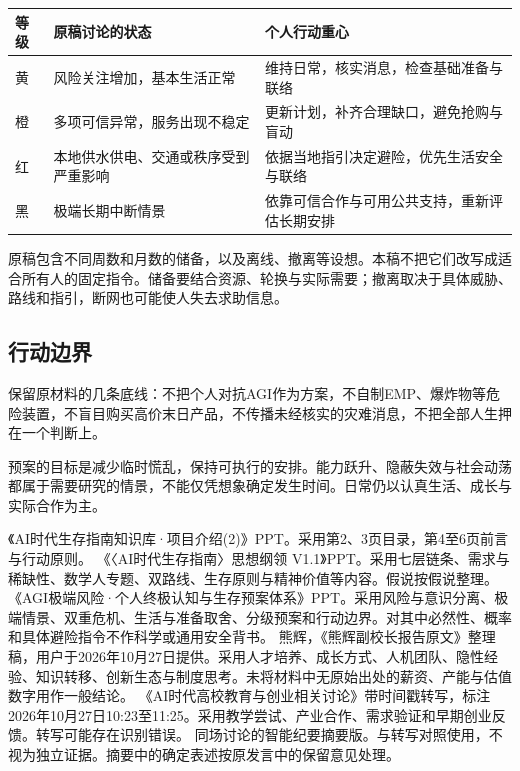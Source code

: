 \documentclass[UTF8,zihao=-4,fontset=fandol,oneside,openany]{ctexbook}
\begin{document}
\begin{center}\small
\begin{tabularx}{\textwidth}{P{0.13\textwidth}YY}
\toprule 等级 & 原稿讨论的状态 & 个人行动重心\\\midrule
黄 & 风险关注增加，基本生活正常 & 维持日常，核实消息，检查基础准备与联络\\
橙 & 多项可信异常，服务出现不稳定 & 更新计划，补齐合理缺口，避免抢购与盲动\\
红 & 本地供水供电、交通或秩序受到严重影响 & 依据当地指引决定避险，优先生活安全与联络\\
黑 & 极端长期中断情景 & 依靠可信合作与可用公共支持，重新评估长期安排\\
\bottomrule
\end{tabularx}
\end{center}

原稿包含不同周数和月数的储备，以及离线、撤离等设想。本稿不把它们改写成适合所有人的固定指令。储备要结合资源、轮换与实际需要；撤离取决于具体威胁、路线和指引，断网也可能使人失去求助信息。

\subsection*{行动边界}
保留原材料的几条底线：不把个人对抗AGI作为方案，不自制EMP、爆炸物等危险装置，不盲目购买高价末日产品，不传播未经核实的灾难消息，不把全部人生押在一个判断上。

预案的目标是减少临时慌乱，保持可执行的安排。能力跃升、隐蔽失效与社会动荡都属于需要研究的情景，不能仅凭想象确定发生时间。日常仍以认真生活、成长与实际合作为主。

\backmatter
\renewcommand{\bibname}{本稿采用的素材}
\begin{thebibliography}{9}
\small\raggedright
{}《AI时代生存指南知识库·项目介绍(2)》PPT。采用第2、3页目录，第4至6页前言与行动原则。
《〈AI时代生存指南〉思想纲领 V1.1》PPT。采用七层链条、需求与稀缺性、数学人专题、双路线、生存原则与精神价值等内容。假说按假说整理。
《AGI极端风险·个人终极认知与生存预案体系》PPT。采用风险与意识分离、极端情景、双重危机、生活与准备取舍、分级预案和行动边界。对其中必然性、概率和具体避险指令不作科学或通用安全背书。
熊辉，《熊辉副校长报告原文》整理稿，用户于2026年10月27日提供。采用人才培养、成长方式、人机团队、隐性经验、知识转移、创新生态与制度思考。未将材料中无原始出处的薪资、产能与估值数字用作一般结论。
《AI时代高校教育与创业相关讨论》带时间戳转写，标注2026年10月27日10:23至11:25。采用教学尝试、产业合作、需求验证和早期创业反馈。转写可能存在识别错误。
同场讨论的智能纪要摘要版。与转写对照使用，不视为独立证据。摘要中的确定表述按原发言中的保留意见处理。
\end{thebibliography}
\end{document}
